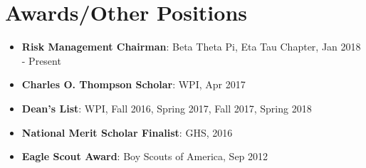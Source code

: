 \documentclass[letterpaper,11pt]{article}
\newcommand{\resumeItem}[2]{
  \item\small{
    \textbf{#1}{: #2 \vspace{-2pt}}
  }
}
\newcommand{\resumeSubItem}[2]{\resumeItem{#1}{#2}\vspace{-4pt}}
\newcommand{\resumeSubHeadingListStart}{\begin{itemize}[leftmargin=*]}
\newcommand{\resumeSubHeadingListEnd}{\end{itemize}}
\begin{document}
\section{Awards/Other Positions}
  \resumeSubHeadingListStart
    \resumeSubItem{Risk Management Chairman}
      {Beta Theta Pi, Eta Tau Chapter, Jan 2018 - Present}
    \resumeSubItem{Charles O. Thompson Scholar}
      {WPI, Apr 2017}
    \resumeSubItem{Dean's List}
      {WPI, Fall 2016, Spring 2017, Fall 2017, Spring 2018}
    \resumeSubItem{National Merit Scholar Finalist}
      {GHS, 2016}
    \resumeSubItem{Eagle Scout Award}
      {Boy Scouts of America, Sep 2012}
  \resumeSubHeadingListEnd

\end{document}
